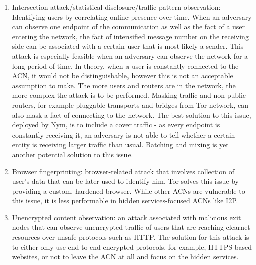 \begin{enumerate}
    \item Intersection attack/statistical disclosure/traffic pattern observation: Identifying users by correlating online presence over time. When an adversary can observe one endpoint of the communication as well as the fact of a user entering the network, the fact of intensified message number on the receiving side can be associated with a certain user that is most likely a sender. This attack is especially feasible when an adversary can observe the network for a long period of time. In theory, when a user is constantly connected to the ACN, it would not be distinguishable, however this is not an acceptable assumption to make. The more users and routers are in the network, the more complex the attack is to be performed. Masking traffic and non-public routers, for example pluggable transports and bridges from Tor network, can also mask a fact of connecting to the network. The best solution to this issue, deployed by Nym, is to include a cover traffic - as every endpoint is constantly receiving it, an adversary is not able to tell whether a certain entity is receiving larger traffic than usual. Batching and mixing is yet another potential solution to this issue.
    \item Browser fingerprinting: browser-related attack that involves collection of user’s data that can be later used to identify him. Tor solves this issue by providing a custom, hardened browser. While other ACNs are vulnerable to this issue, it is less performable in hidden services-focused ACNs like I2P.
    \item Unencrypted content observation: an attack associated with malicious exit nodes that can observe unencrypted traffic of users that are reaching clearnet resources over unsafe protocols such as HTTP. The solution for this attack is to either only use end-to-end encrypted protocols, for example, HTTPS-based websites, or not to leave the ACN at all and focus on the hidden services.
\end{enumerate}

